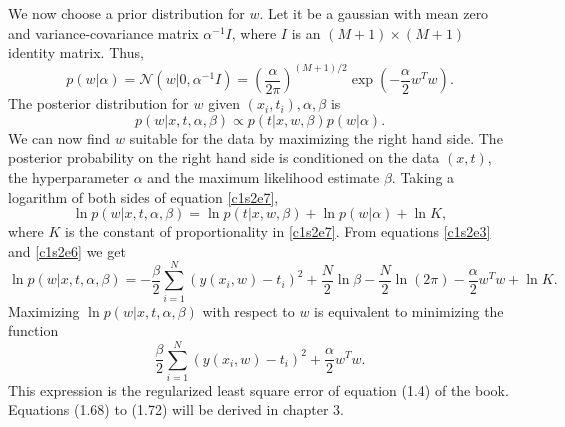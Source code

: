 We now choose a prior distribution for $w$. Let it be a gaussian with mean zero and variance-covariance
matrix $\alpha^{-1}I$, where $I$ is an $(M+1) \times (M+1)$ identity matrix. Thus,
\begin{equation}\label{c1s2e6}
p(w|\alpha) = \mathcal{N}(w|0, \alpha^{-1}I) = \left(\frac{\alpha}{2\pi}\right)^{(M+1)/2}\exp\left(-\frac{\alpha}{2}w^Tw\right).
\end{equation}
The posterior distribution for $w$ given $(x_i, t_i), \alpha, \beta$ is
\begin{equation}\label{c1s2e7}
p(w|x, t, \alpha, \beta) \propto p(t|x,w,\beta)p(w|\alpha).
\end{equation}
We can now find $w$ suitable for the data by maximizing the right hand side. The posterior probability
on the right hand side is conditioned on the data $(x, t)$, the hyperparameter $\alpha$ and the maximum
likelihood estimate $\beta$. Taking a logarithm of both sides of equation \eqref{c1s2e7},
\[
\ln p(w|x,t,\alpha,\beta) = \ln p(t|x,w,\beta) + \ln p(w|\alpha) + \ln K,
\]
where $K$ is the constant of proportionality in \eqref{c1s2e7}. From equations \eqref{c1s2e3} and
\eqref{c1s2e6} we get
\[
\ln p(w|x,t,\alpha,\beta) = -\frac{\beta}{2}\sum_{i=1}^N(y(x_i, w) - t_i)^2 + \frac{N}{2}\ln\beta - \frac{N}{2}\ln(2\pi) - \frac{\alpha}{2}w^Tw + \ln K.
\]
Maximizing $\ln p(w|x,t,\alpha,\beta)$ with respect to $w$ is equivalent to minimizing the function
\[
\frac{\beta}{2}\sum_{i=1}^N(y(x_i, w) - t_i)^2 + \frac{\alpha}{2}w^Tw.
\]
This expression is the regularized least square error of equation (1.4) of the book. Equations (1.68) to (1.72)
will be derived in chapter 3.

